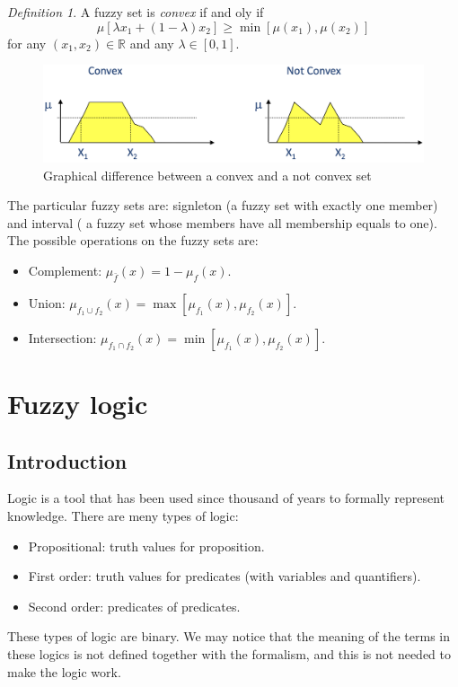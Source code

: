 \documentclass[12pt, a4paper]{report}
\theoremstyle{remark}
\newtheorem*{remark}{Definition}
\theoremstyle{definition}
\begin{document}
    \begin{remark}
        A fuzzy set is \emph{convex} if and oly if 
        \[\mu[\lambda x_1+(1-\lambda)x_2] \geq \min [\mu(x_1),\mu(x_2)]\]
        for any $(x_1,x_2) \in \mathbb{R}$ and any $\lambda \in [0,1]$.
    \end{remark}
    \begin{figure}[H]
        \centering
        \includegraphics[width=0.75\linewidth]{images/convex.png}
        \caption{Graphical difference between a convex and a not convex set}
    \end{figure}
    The particular fuzzy sets are: signleton (a fuzzy set with exactly one member) and interval ( a fuzzy set whose members have all membership
    equals to one). The possible operations on the fuzzy sets are: 
    \begin{itemize}
        \item Complement: $\mu_{\bar{f}}(x)=1-\mu_f(x)$.
        \item Union: $\mu_{f_1 \cup f_2}(x)=\max [\mu_{f_1}(x),\mu_{f_2}(x)]$.
        \item Intersection: $\mu_{f_1 \cap f_2}(x)=\min [\mu_{f_1}(x),\mu_{f_2}(x)]$.
    \end{itemize}

    \newpage

    \chapter{Fuzzy logic}
    \section{Introduction}
    Logic is a tool that has been used since thousand of years to formally represent knowledge. There are meny types of logic: 
    \begin{itemize}
        \item Propositional: truth values for proposition.
        \item First order: truth values for predicates (with variables and quantifiers).
        \item Second order: predicates of predicates.
    \end{itemize}
    These types of logic are binary. We may notice that the meaning of the terms in these logics is not defined together with the formalism,
    and this is not needed to make the logic work.
\end{document}
